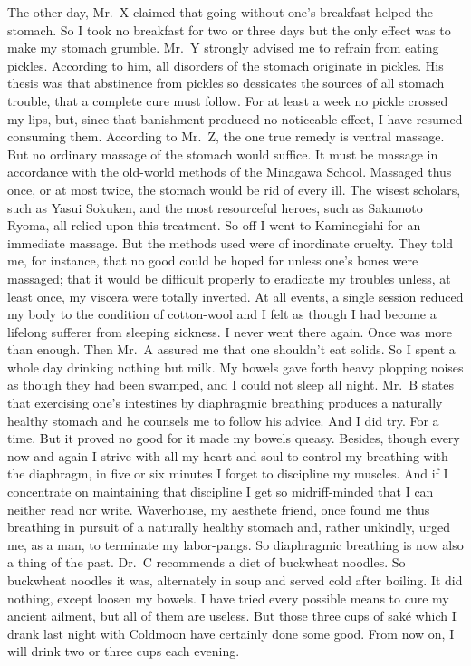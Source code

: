 \documentclass{book}
\begin{document}
The other day, Mr.~X claimed that going without one's breakfast helped
the stomach. So I took no breakfast for two or three days but the only
effect was to make my stomach grumble. Mr.~Y strongly advised me to
refrain from eating pickles. According to him, all disorders of the
stomach originate in pickles. His thesis was that abstinence from
pickles so dessicates the sources of all stomach trouble, that a
complete cure must follow. For at least a week no pickle crossed my
lips, but, since that banishment produced no noticeable effect, I have
resumed consuming them. According to Mr.~Z, the one true remedy is
ventral massage. But no ordinary massage of the stomach would suffice.
It must be massage in accordance with the old-world methods of the
Minagawa School. Massaged thus once, or at most twice, the stomach would
be rid of every ill. The wisest scholars, such as Yasui Sokuken, and the
most resourceful heroes, such as Sakamoto Ryoma, all relied upon this
treatment. So off I went to Kaminegishi for an immediate massage. But
the methods used were of inordinate cruelty. They told me, for instance,
that no good could be hoped for unless one's bones were massaged; that
it would be difficult properly to eradicate my troubles unless, at least
once, my viscera were totally inverted. At all events, a single session
reduced my body to the condition of cotton-wool and I felt as though I
had become a lifelong sufferer from sleeping sickness. I never went
there again. Once was more than enough. Then Mr.~A assured me that one
shouldn't eat solids. So I spent a whole day drinking nothing but milk.
My bowels gave forth heavy plopping noises as though they had been
swamped, and I could not sleep all night. Mr.~B states that exercising
one's intestines by diaphragmic breathing produces a naturally healthy
stomach and he counsels me to follow his advice. And I did try. For a
time. But it proved no good for it made my bowels queasy. Besides,
though every now and again I strive with all my heart and soul to
control my breathing with the diaphragm, in five or six minutes I forget
to discipline my muscles. And if I concentrate on maintaining that
discipline I get so midriff-minded that I can neither read nor write.
Waverhouse, my aesthete friend, once found me thus breathing in pursuit
of a naturally healthy stomach and, rather unkindly, urged me, as a man,
to terminate my labor-pangs. So diaphragmic breathing is now also a
thing of the past. Dr.~C recommends a diet of buckwheat noodles. So
buckwheat noodles it was, alternately in soup and served cold after
boiling. It did nothing, except loosen my bowels. I have tried every
possible means to cure my ancient ailment, but all of them are useless.
But those three cups of saké which I drank last night with Coldmoon have
certainly done some good. From now on, I will drink two or three cups
each evening.
\end{document}
